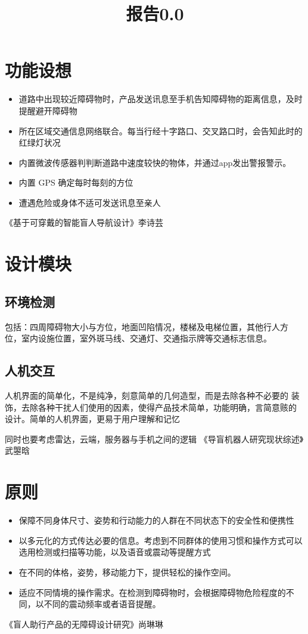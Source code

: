 \documentclass[UTF8]{ctexart}
\title{\textbf{报告0.0}}
\begin{document}
\date{}
\maketitle
\section{功能设想}
\begin{itemize}
    \item 道路中出现较近障碍物时，产品发送讯息至手机告知障碍物的距离信息，及时提醒避开障碍物
    \item 所在区域交通信息网络联合。每当行经十字路口、交叉路口时，会告知此时的红绿灯状况
    \item  内置微波传感器判判断道路中速度较快的物体，并通过app发出警报警示。
    \item 内置 GPS 确定每时每刻的方位
    \item 遭遇危险或身体不适可发送讯息至亲人
\end{itemize}

《基于可穿戴的智能盲人导航设计》李诗芸

\section{设计模块}
\subsection{环境检测}
包括：四周障碍物大小与方位，地面凹陷情况，楼梯及电梯位置，其他行人方
位，室内设施位置，室外斑马线、交通灯、交通指示牌等交通标志信息。
\subsection{人机交互}
人机界面的简单化，不是纯净，刻意简单的几何造型，而是去除各种不必要的
装饰，去除各种干扰人们使用的因素，使得产品技术简单，功能明确，言简意赅的
设计。简单的人机界面，更易于用户理解和记忆

同时也要考虑雷达，云端，服务器与手机之间的逻辑
《导盲机器人研究现状综述》武曌晗
\section{原则}
\begin{itemize}
    \item 保障不同身体尺寸、姿势和行动能力的人群在不同状态下的安全性和便携性
    \item 以多元化的方式传达必要的信息。考虑到不同群体的使用习惯和操作方式可以选用检测或扫描等功能，以及语音或震动等提醒方式
    \item 在不同的体格，姿势，移动能力下，提供轻松的操作空间。
    \item 适应不同情境的操作需求。在检测到障碍物时，会根据障碍物危险程度的不同，以不同的震动频率或者语音提醒。
\end{itemize}

《盲人助行产品的无障碍设计研究》尚琳琳
\end{document}
